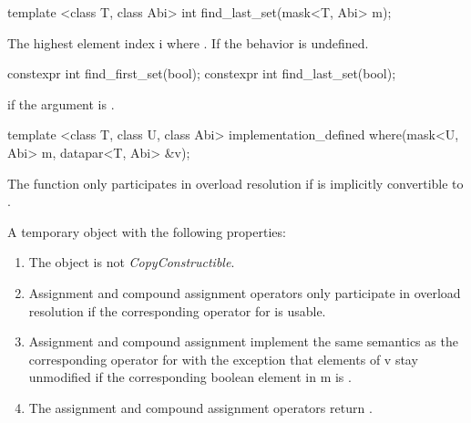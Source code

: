 \begin{itemdecl}
template <class T, class Abi> int find_last_set(mask<T, Abi> m);
\end{itemdecl}
\begin{itemdescr}
  \pnum\returns The highest element index \code i where .
  \pnum\remarks If  the behavior is undefined.
\end{itemdescr}

\begin{itemdecl}
constexpr int find_first_set(bool);
constexpr int find_last_set(bool);
\end{itemdecl}
\begin{itemdescr}
  \pnum{} if the argument is \true.
\end{itemdescr}

\begin{itemdecl}
template <class T, class U, class Abi> implementation_defined where(mask<U, Abi> m, datapar<T, Abi> &v);
\end{itemdecl}
\begin{itemdescr}
  \pnum\remarks The function only participates in overload resolution if \mask[<U, Abi>] is implicitly convertible to \mask[<T, Abi>].

  \pnum\returns A temporary object with the following properties:
  \begin{enumerate}
    \item The object is not \textit{CopyConstructible}.
    \item Assignment and compound assignment operators only participate in overload resolution if the corresponding operator for \datapar[<T, Abi>] is usable.
    \item \effects Assignment and compound assignment implement the same semantics as the corresponding operator for \datapar[<T, Abi>] with the exception that elements of \code v stay unmodified if the corresponding boolean element in \code m is \false.
    \item The assignment and compound assignment operators return \void.
  \end{enumerate}
\end{itemdescr}

